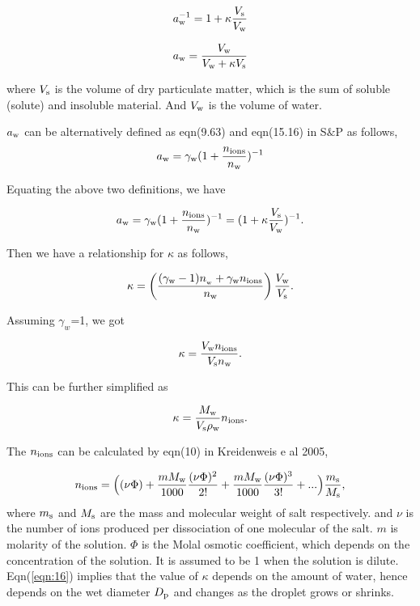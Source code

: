 \documentclass[12pt]{article}
\begin{document}
\begin{equation}\label{eqn:10}
a_{\rm w}^{-1}=1+\kappa \frac{V_{\rm s}}{V_{\rm w}}
\end{equation}

\begin{equation}\label{eqn:11}
a_{\rm w}=\frac{V_{\rm w}}{V_{\rm w} + \kappa V_{\rm s}}
\end{equation}

where $V_{\rm s}$ is the volume of dry particulate matter, which is the sum of soluble (solute) and insoluble material. And $V_{\rm w}$ is the volume of water.

$a_{\rm w}$ can be alternatively defined as eqn(9.63) and eqn(15.16) in S$\&$P as follows, 
\begin{equation}\label{eqn:12}
a_{\rm w}=\gamma_{\rm w}(1+\frac{n_{\rm ions}}{n_{\rm w}})^{-1}
\end{equation}

Equating the above two definitions, we have

\begin{equation}\label{eqn:13}
a_{\rm w}=\gamma_{\rm w}(1+\frac{n_{\rm ions}}{n_{\rm w}})^{-1}=(1+\kappa \frac{V_{\rm s}}{V_{\rm w}})^{-1}.
\end{equation}

Then we have a relationship for $\kappa$ as follows,

\begin{equation}
\kappa=\left(\frac{(\gamma_{\rm w}-1)n_{\rm_w}+\gamma_{\rm w}n_{\rm ions}}{n_{\rm w}}\right)\frac{V_{\rm w}}{V_{\rm s}}.
\end{equation} 

Assuming $\gamma_{w}$=1, we got 

\begin{equation}\label{eqn:14}
\kappa= \frac{V_{\rm w} n_{\rm ions}}{V_{\rm s} n_{\rm w}}.
\end{equation}

This can be further simplified as 

\begin{equation}\label{eqn:15}
\kappa= \frac{M_{\rm w}}{V_{\rm s} \rho_{\rm w}}n_{\rm ions}.
\end{equation}

The $n_{\rm ions}$ can be  calculated by eqn(10) in Kreidenweis e al 2005, 

\begin{equation}\label{eqn:16}
n_{\rm ions}=\Big((\nu \Phi) + \frac{m M_{\rm w}}{1000} \frac{(\nu \Phi)^{2}}{2!} + \frac{m M_{\rm w}}{1000} \frac{(\nu \Phi)^{3}}{3!}+... \Big) \frac{m_{\rm s}}{M_{\rm s}},
\end{equation}
where $m_{\rm s}$ and $M_{\rm s}$ are the mass and molecular weight of salt respectively. and $\nu$ is the number of ions produced per dissociation of one molecular of the salt. $m$ is molarity of the solution. $\Phi$ is the Molal osmotic coefficient, which depends on the concentration of the solution. It is assumed to be 1 when the solution is dilute. Eqn(\ref{eqn:16}) implies that the value of $\kappa$ depends on the amount of water, hence depends on the wet diameter $D_{\rm p}$ and changes as the droplet grows or shrinks.
\end{document}
